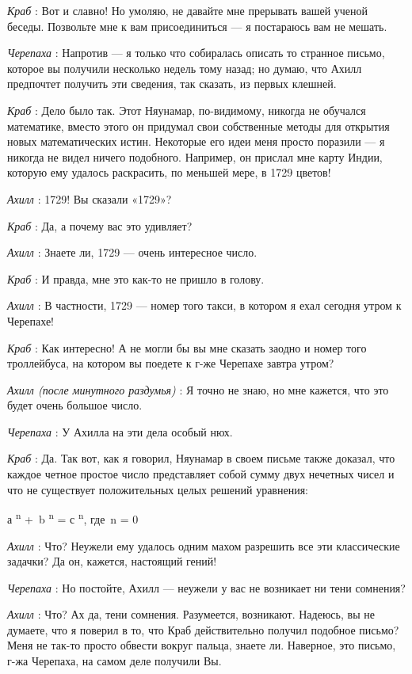 \documentclass[../main.tex]{subfiles}
\begin{document}
\begin{dialogue}
\emph{Краб} : Вот и славно! Но умоляю, не давайте мне прерывать вашей ученой беседы. Позвольте мне к вам присоединиться --- я постараюсь вам не мешать.

\emph{Черепаха} : Напротив --- я только что собиралась описать то странное письмо, которое вы получили несколько недель тому назад; но думаю, что Ахилл предпочтет получить эти сведения, так сказать, из первых клешней.

\emph{Краб} : Дело было так. Этот Няунамар, по-видимому, никогда не обучался математике, вместо этого он придумал свои собственные методы для открытия новых математических истин. Некоторые его идеи меня просто поразили --- я никогда не видел ничего подобного. Например, он прислал мне карту Индии, которую ему удалось раскрасить, по меньшей мере, в 1729 цветов!

\emph{Ахилл} : 1729! Вы сказали «1729»?

\emph{Краб} : Да, а почему вас это удивляет?

\emph{Ахилл} : Знаете ли, 1729 --- очень интересное число.

\emph{Краб} : И правда, мне это как-то не пришло в голову.

\emph{Ахилл} : В частности, 1729 --- номер того такси, в котором я ехал сегодня утром к Черепахе!

\emph{Краб} : Как интересно! А не могли бы вы мне сказать заодно и номер того троллейбуса, на котором вы поедете к г-же Черепахе завтра утром?

\emph{Ахилл (после минутного раздумья)} : Я точно не знаю, но мне кажется, что это будет очень большое число.

\emph{Черепаха} : У Ахилла на эти дела особый нюх.

\emph{Краб} : Да. Так вот, как я говорил, Няунамар в своем письме также доказал, что каждое четное простое число представляет собой сумму двух нечетных чисел и что не существует положительных целых решений уравнения:

а \textsuperscript{n} +~b \textsuperscript{n} = с \textsuperscript{n}, где~n = 0

\emph{Ахилл} : Что? Неужели ему удалось одним махом разрешить все эти классические задачки? Да он, кажется, настоящий гений!

\emph{Черепаха} : Но постойте, Ахилл --- неужели у вас не возникает ни тени сомнения?

\emph{Ахилл} : Что? Ах да, тени сомнения. Разумеется, возникают. Надеюсь, вы не думаете, что я поверил в то, что Краб действительно получил подобное письмо? Меня не так-то просто обвести вокруг пальца, знаете ли. Наверное, это письмо, г-жа Черепаха, на самом деле получили Вы.


\end{dialogue}
\end{document}
